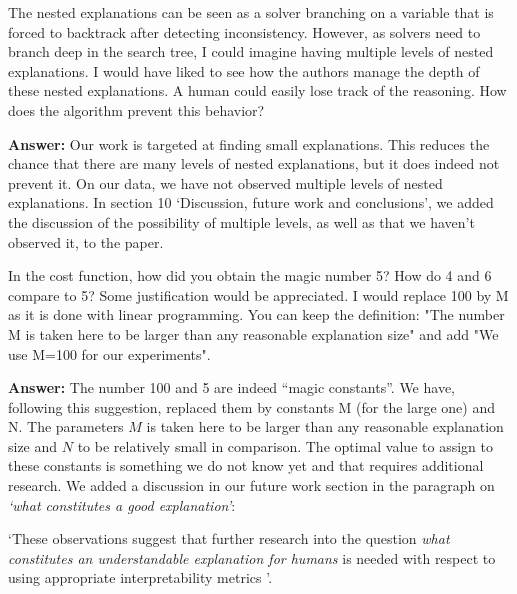 \documentclass{article}
\newcommand\comment[1]{\marginpar{\tiny #1}}
\renewcommand\comment[1]{#1}
\newcommand{\tias}[1]{{\comment{\color{blue}\textsc{TG:}#1}}}
\newcommand{\answer}[1]{{\comment{\textbf{Answer:} #1}}}
\newcommand{\bart}[1]{{\comment{\color{green} \textsc{BB:}#1}}}
\begin{document}
\begin{quoteit}
The nested explanations can be seen as a solver branching on a variable that is forced to backtrack after detecting inconsistency. However, as solvers need to branch deep in the search tree, I could imagine having multiple levels of nested explanations. I would have liked to see how the authors manage the depth of these nested explanations. A human could easily lose track of the reasoning. How does the algorithm prevent this behavior?
\end{quoteit}

\answer{Our work is targeted at finding small explanations. This reduces the chance that there are many levels of nested explanations, but it does indeed not prevent it. On our data, we have not observed multiple levels of nested explanations. In section 10 `Discussion, future work and conclusions', we added the discussion of the possibility of multiple levels, as well as that we haven't observed it, to the paper.} 

\begin{quoteit}
In the cost function, how did you obtain the magic number 5? How do 4 and 6 compare to 5? Some justification would be appreciated. 
I would replace 100 by M as it is done with linear programming. You can keep the definition: "The number M is taken here to be larger than any reasonable explanation size" and add "We use M=100 for our experiments".
\end{quoteit}

\answer{
	The number 100 and 5 are indeed ``magic constants''. We have, following this suggestion, replaced them by constants M (for the large one) and N. The parameters $M$ is taken here to be larger than any reasonable explanation size and $N$ to be relatively small in comparison. The optimal value to assign to these constants is something we do not know yet and that requires additional research. We added a discussion in our future work section in the paragraph on \emph{`what constitutes a good explanation'}: 
	
		`These observations suggest that further research into the question \emph{what constitutes an understandable explanation for humans} is needed with respect to using appropriate interpretability metrics \cite{hoffman2018metrics,rosenfeld2021better}'.
} 
\end{document}
